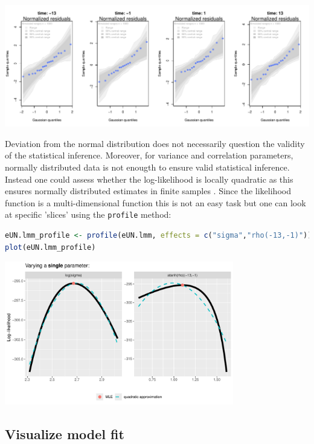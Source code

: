 \documentclass[12pt]{article}
\newcommand\Warning[1][3ex]{%
\renewcommand\stacktype{L}%
\scaleto{\stackon[1.3pt]{\color{red}$\triangle$}{\tiny\bfseries !}}{#1}%
\xspace
}
\begin{document}
\begin{center}
\includegraphics[width=\textwidth]{./figures/diag-qqplot.pdf}
\end{center}

\Warning Deviation from the normal distribution does not necessarily
question the validity of the statistical inference. Moreover, for
variance and correlation parameters, normally distributed data is not
enougth to ensure valid statistical inference. Instead one could
assess whether the log-likelihood is locally quadratic as this ensures
normally distributed estimates in finite samples
\citep{geyer2013asymptotics}. Since the likelihood function is a
multi-dimensional function this is not an easy task but one can look
at specific 'slices' using the \texttt{profile} method:

\begin{lstlisting}[language=r,numbers=none]
eUN.lmm_profile <- profile(eUN.lmm, effects = c("sigma","rho(-13,-1)"))
plot(eUN.lmm_profile)
\end{lstlisting}


\begin{center}
\includegraphics[width=0.75\textwidth]{./figures/diag-profileUN.pdf}
\end{center}

\clearpage
\subsection{Visualize model fit}
\label{sec:orga08a345}
\end{document}
